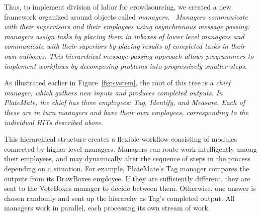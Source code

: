 
%





Thus, to implement division of labor for crowdsourcing, we created a new
framework organized around objects called \em managers.\em\  
Managers communicate with their supervisors and their \em employees \em using asynchronous message passing: managers assign tasks by placing them in inboxes of lower level managers and communicate with their superiors by placing results of completed tasks in their own outboxes.
This hierarchical message-passing approach allows programmers
to implement workflows by decomposing problems into progressively
smaller steps.

As illustrated earlier in Figure~\ref{fig:system}, the root of this tree is a \em chief \em manager, which gathers new inputs
and produces completed outputs. In PlateMate, the chief has three
employees: Tag, Identify, and Measure. Each of these are in turn
managers and have their own employees, corresponding to the individual
HITs described above.

This hierarchical structure creates a flexible workflow consisting of
 modules connected by higher-level managers. Managers can route work intelligently among their
employees, and may dynamically alter the sequence of steps in the process depending on a situation. For example, PlateMate's Tag manager compares the outputs from its
DrawBoxes employee. If they are sufficiently different, they are sent
to the VoteBoxes manager to decide between them. Otherwise, one answer
is chosen randomly and sent up the hierarchy as Tag's completed
output. All managers work in parallel, each processing its own stream of
work. 

